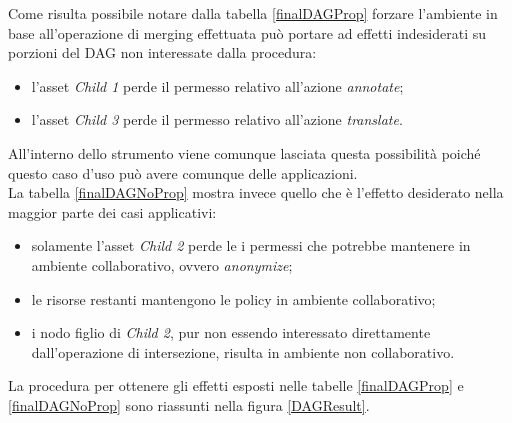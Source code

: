 \documentclass[12pt,a4paper,twoside]{book}
\begin{document}
Come risulta possibile notare dalla tabella \ref{finalDAGProp} forzare l'ambiente in base all'operazione di merging effettuata può portare ad effetti indesiderati su porzioni del DAG non interessate dalla procedura:
\begin{itemize}
\item l'asset \textit{Child 1} perde il permesso relativo all'azione \textit{annotate};
\item l'asset \textit{Child 3} perde il permesso relativo all'azione \textit{translate}.
\end{itemize}
All'interno dello strumento viene comunque lasciata questa possibilità poiché questo caso d'uso può avere comunque delle applicazioni.\\
La tabella \ref{finalDAGNoProp} mostra invece quello che è l'effetto desiderato nella maggior parte dei casi applicativi:
\begin{itemize}
\item solamente l'asset \textit{Child 2} perde le i permessi che potrebbe mantenere in ambiente collaborativo, ovvero \textit{anonymize};
\item le risorse restanti mantengono le policy in ambiente collaborativo;
\item i nodo figlio di \textit{Child 2}, pur non essendo interessato direttamente dall'operazione di intersezione, risulta in ambiente non collaborativo.
\end{itemize}
La procedura per ottenere gli effetti esposti nelle tabelle \ref{finalDAGProp} e \ref{finalDAGNoProp} sono riassunti nella figura \ref{DAGResult}. 
\end{document}
